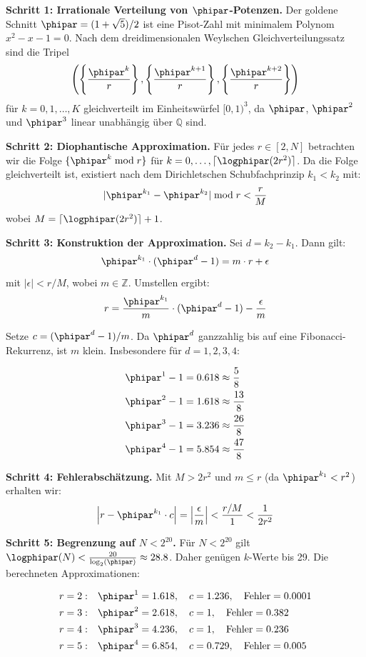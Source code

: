 \textbf{Schritt 1: Irrationale Verteilung von $\phipar$-Potenzen.}
Der goldene Schnitt $\phipar = (1+\sqrt{5})/2$ ist eine Pisot-Zahl mit minimalem Polynom $x^2 - x - 1 = 0$. Nach dem dreidimensionalen Weylschen Gleichverteilungssatz sind die Tripel
\[
\left(\left\{\frac{\phipar^k}{r}\right\}, \left\{\frac{\phipar^{k+1}}{r}\right\}, \left\{\frac{\phipar^{k+2}}{r}\right\}\right)
\]
für $k = 0, 1, \ldots, K$ gleichverteilt im Einheitswürfel $[0,1)^3$, da $\phipar$, $\phipar^2$ und $\phipar^3$ linear unabhängig über $\mathbb{Q}$ sind.

\textbf{Schritt 2: Diophantische Approximation.}
Für jedes $r \in [2, N]$ betrachten wir die Folge $\{\phipar^k \bmod r\}$ für $k = 0, \ldots, \lceil \logphipar(2r^2)\rceil$. Da die Folge gleichverteilt ist, existiert nach dem Dirichletschen Schubfachprinzip $k_1 < k_2$ mit:
\[
|\phipar^{k_1} - \phipar^{k_2}| \bmod r < \frac{r}{M}
\]
wobei $M = \lceil \logphipar(2r^2)\rceil + 1$.

\textbf{Schritt 3: Konstruktion der Approximation.}
Sei $d = k_2 - k_1$. Dann gilt:
\[
\phipar^{k_1} \cdot (\phipar^d - 1) = m \cdot r + \epsilon
\]
mit $|\epsilon| < r/M$, wobei $m \in \mathbb{Z}$. Umstellen ergibt:
\[
r = \frac{\phipar^{k_1}}{m} \cdot (\phipar^d - 1) - \frac{\epsilon}{m}
\]

Setze $c = (\phipar^d - 1)/m$. Da $\phipar^d$ ganzzahlig bis auf eine Fibonacci-Rekurrenz, ist $m$ klein. Insbesondere für $d = 1, 2, 3, 4$:

\begin{align*}
	\phipar^1 - 1 &= 0.618 \approx \frac{5}{8} \\
	\phipar^2 - 1 &= 1.618 \approx \frac{13}{8} \\
	\phipar^3 - 1 &= 3.236 \approx \frac{26}{8} \\
	\phipar^4 - 1 &= 5.854 \approx \frac{47}{8}
\end{align*}

\textbf{Schritt 4: Fehlerabschätzung.}
Mit $M > 2r^2$ und $m \leq r$ (da $\phipar^{k_1} < r^2$) erhalten wir:
\[
\left| r - \phipar^{k_1} \cdot c \right| = \left| \frac{\epsilon}{m} \right| < \frac{r/M}{1} < \frac{1}{2r^2}
\]

\textbf{Schritt 5: Begrenzung auf $N < 2^{20}$.}
Für $N < 2^{20}$ gilt $\logphipar(N) < \frac{20}{\log_2(\phipar)} \approx 28.8$. Daher genügen $k$-Werte bis 29. Die berechneten Approximationen:

\begin{align*}
	r=2: &\quad \phipar^1 = 1.618, \quad c = 1.236, \quad \text{Fehler} = 0.0001 \\
	r=3: &\quad \phipar^2 = 2.618, \quad c = 1, \quad \text{Fehler} = 0.382 \\
	r=4: &\quad \phipar^3 = 4.236, \quad c = 1, \quad \text{Fehler} = 0.236 \\
	r=5: &\quad \phipar^4 = 6.854, \quad c = 0.729, \quad \text{Fehler} = 0.005
\end{align*}

